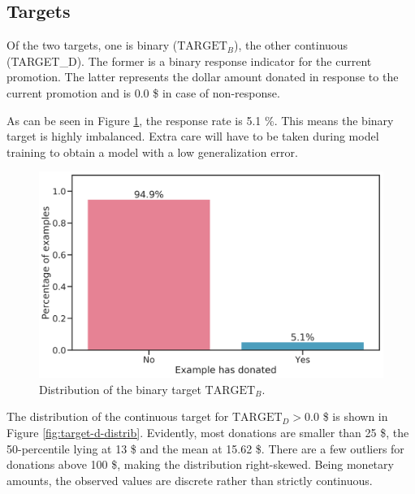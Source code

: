 \documentclass[
  11pt,
  a4paper,
  DIV=12,captions=tableheading,oneside,titlepage]{scrbook}
\begin{document}
\hypertarget{targets}{%
\subsection{Targets}\label{targets}}

Of the two targets, one is binary (\(\text{TARGET}_B\)), the other continuous (TARGET\_D). The former is a binary response indicator for the current promotion. The latter represents the dollar amount donated in response to the current promotion and is 0.0 \$ in case of non-response.

As can be seen in Figure \ref{fig:target-ratio}, the response rate is 5.1 \%. This means the binary target is highly imbalanced. Extra care will have to be taken during model training to obtain a model with a low generalization error.



\begin{figure}

{\centering \includegraphics[width=0.7\linewidth]{figures/eda/ratio-binary} 

}

\caption{Distribution of the binary target \(\text{TARGET}_B\).}\label{fig:target-ratio}
\end{figure}

The distribution of the continuous target for \(\text{TARGET}_D > 0.0\) \$ is shown in Figure \ref{fig:target-d-distrib}. Evidently, most donations are smaller than 25 \$, the 50-percentile lying at 13 \$ and the mean at 15.62 \$. There are a few outliers for donations above 100 \$, making the distribution right-skewed. Being monetary amounts, the observed values are discrete rather than strictly continuous.
\end{document}
